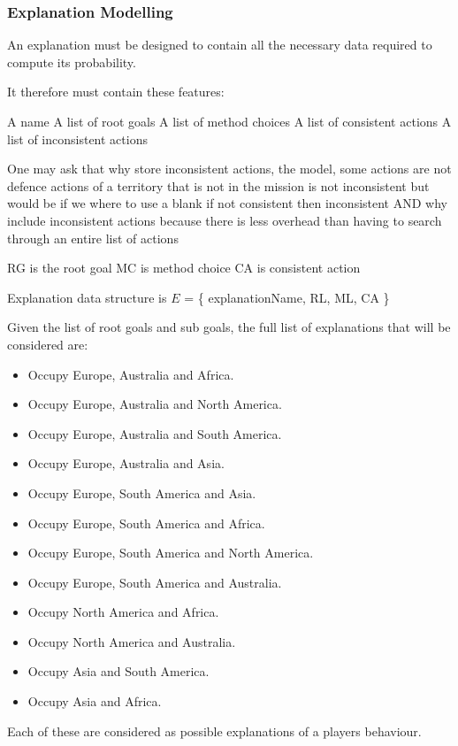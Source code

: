 \documentclass[parskip]{cs4rep}
\begin{document}
\subsubsection{Explanation Modelling}

An explanation must be designed to contain all the necessary data required to compute its probability.

It therefore must contain these features:

A name
A list of root goals
A list of method choices
A list of consistent actions
A list of inconsistent actions

One may ask that why store inconsistent actions, the model, some actions are not defence actions of a territory that is not in the mission is not inconsistent but would be if we where to use a blank if not consistent then inconsistent AND why include inconsistent actions because there is less overhead than having to search through an entire list of actions

RG is the root goal
MC is method choice
CA is consistent action

Explanation data structure is $E$ = \{ explanationName, RL, ML, CA \}

Given the list of root goals and sub goals, the full list of explanations that will be considered are:

\begin{itemize}
\item
Occupy Europe, Australia and Africa.
\item
Occupy Europe, Australia and North America.
\item
Occupy Europe, Australia and South America.
\item
Occupy Europe, Australia and Asia.
\item
Occupy Europe, South America and Asia.
\item
Occupy Europe, South America and Africa.
\item
Occupy Europe, South America and North America.
\item
Occupy Europe, South America and Australia.
\item
Occupy North America and Africa.
\item
Occupy North America and Australia.
\item
Occupy Asia and South America.
\item
Occupy Asia and Africa.
\newline
\end{itemize}

Each of these are considered as possible explanations of a players behaviour.
\end{document}
